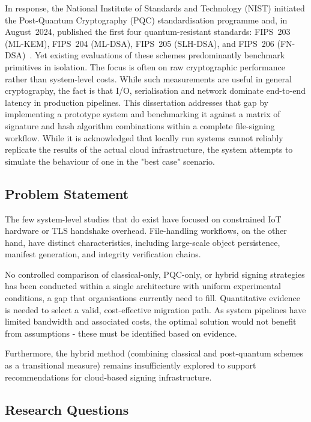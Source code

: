 \documentclass[12pt,a4paper]{article}
\begin{document}
In response, the National Institute of Standards and Technology (NIST) initiated the Post-Quantum Cryptography (PQC) standardisation programme and, in August~2024, published the first four quantum-resistant standards: FIPS~203 (ML-KEM), FIPS~204 (ML-DSA), FIPS~205 (SLH-DSA), and FIPS~206 (FN-DSA)~\cite{nist-fips-203-2024,nist-fips-204-2024,nist-fips-205-2024,nist-fips206-2024}. Yet existing evaluations of these schemes predominantly benchmark primitives in isolation. The focus is often on raw cryptographic performance rather than system-level costs. While such measurements are useful in general cryptography, the fact is that I/O, serialisation and network dominate end-to-end latency in production pipelines. This dissertation addresses that gap by implementing a prototype system and benchmarking it against a matrix of signature and hash algorithm combinations within a complete file-signing workflow. While it is acknowledged that locally run systems cannot reliably replicate the results of the actual cloud infrastructure, the system attempts to simulate the behaviour of one in the "best case" scenario.

\subsection{Problem Statement}

The few system-level studies that do exist have focused on constrained IoT hardware or TLS handshake overhead. File-handling workflows, on the other hand, have distinct characteristics, including large-scale object persistence, manifest generation, and integrity verification chains.

No controlled comparison of classical-only, PQC-only, or hybrid signing strategies has been conducted within a single architecture with uniform experimental conditions, a gap that organisations currently need to fill. Quantitative evidence is needed to select a valid, cost-effective migration path. As system pipelines have limited bandwidth and associated costs, the optimal solution would not benefit from assumptions - these must be identified based on evidence.

Furthermore, the hybrid method (combining classical and post-quantum schemes as a transitional measure) remains insufficiently explored to support recommendations for cloud-based signing infrastructure.

\subsection{Research Questions}
\label{sec:intro:rqs}
\end{document}
